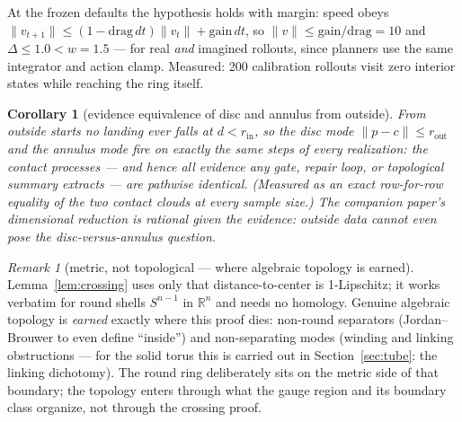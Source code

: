 \documentclass[11pt]{article}
\newtheorem{corollary}{Corollary}
\theoremstyle{remark}
\newtheorem{remark}{Remark}
\begin{document}
At the frozen defaults the hypothesis holds with margin: speed obeys
$\lVert v_{t+1} \rVert \le (1 - \mathrm{drag}\,dt)\lVert v_t \rVert +
\mathrm{gain}\,dt$, so $\lVert v \rVert \le \mathrm{gain}/\mathrm{drag}
= 10$ and $\Delta \le 1.0 < w = 1.5$ --- for real \emph{and} imagined
rollouts, since planners use the same integrator and action clamp. Measured:
200 calibration rollouts visit zero interior states while reaching the ring
itself.

\begin{corollary}[evidence equivalence of disc and annulus from outside]
\label{cor:evidence}
From outside starts no landing ever falls at
$d < r_{\mathrm{in}}$, so the disc mode
$\lVert p - c \rVert \le r_{\mathrm{out}}$ and the annulus mode fire on
exactly the same steps of every realization: the contact processes --- and
hence \emph{all} evidence any gate, repair loop, or topological summary
extracts --- are pathwise identical. (Measured as an exact row-for-row
equality of the two contact clouds at every sample size.) The companion
paper's dimensional reduction is \emph{rational given the evidence}:
outside data cannot even pose the disc-versus-annulus question.
\end{corollary}

\begin{remark}[metric, not topological --- where algebraic topology is
earned]
Lemma~\ref{lem:crossing} uses only that distance-to-center is 1-Lipschitz;
it works verbatim for round shells $S^{n-1}$ in $\mathbb{R}^n$ and needs no
homology. Genuine algebraic topology is \emph{earned} exactly where this
proof dies: non-round separators (Jordan--Brouwer to even define
``inside'') and non-separating modes (winding and linking obstructions ---
for the solid torus this is carried out in Section~\ref{sec:tube}: the
linking dichotomy). The round ring deliberately sits on the metric side of
that boundary; the topology enters through what the gauge region and its
boundary class organize, not through the crossing proof.
\end{remark}
\end{document}

